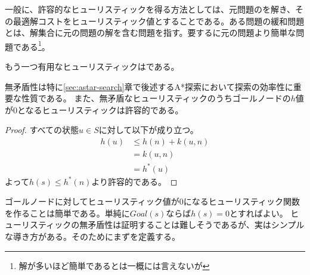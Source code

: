一般に、許容的なヒューリスティックを得る方法としては、元問題のを解き、その最適解コストをヒューリスティック値とすることである。ある問題の緩和問題とは、解集合に元の問題の解を含む問題を指す。要するに元の問題より簡単な問題である\footnote{解が多いほど簡単であるとは一概には言えないが}。


もう一つ有用なヒューリスティックはである。


無矛盾性は特に\ref{sec:astar-search}章で後述するA*探索において探索の効率性に重要な性質である。
また、無矛盾なヒューリスティックのうちゴールノードの$h$値が0となるヒューリスティックは許容的である。


\begin{proof}
        すべての状態$u \in S$に対して以下が成り立つ。
\begin{align}
	h(u) &\leq h(n) + k(u, n) \\
             &= k(u, n) \\
             &= h^*(u)
\end{align}
        よって$h(s) \leq h^*(n)$より許容的である。
\end{proof}

ゴールノードに対してヒューリスティック値が$0$になるヒューリスティック関数を作ることは簡単である。単純に$Goal(s)$ならば$h(s)=0$とすればよい。
ヒューリスティックの無矛盾性は証明することは難しそうであるが、実はシンプルな導き方がある。そのためにまずを定義する。


